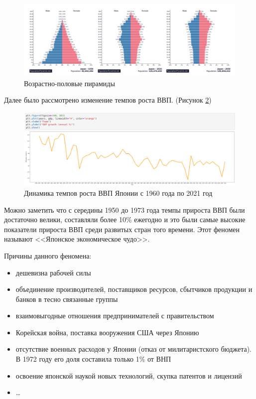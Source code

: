\documentclass[14pt,fleqn]{extarticle}
\begin{document}
	\begin{figure}[h]
		\centering \includegraphics[scale=0.43]{japan_pyramid}
		\caption{Возрастно-половые пирамиды}
		\label{fig:japan_pyramid}
	\end{figure}
	
	Далее было рассмотрено изменение темпов роста ВВП. (Рисунок \ref{fig:japan_gdp_growth_plot})
	
	\begin{figure}[h]
		\centering \includegraphics[scale=0.43]{japan_gdp_growth_plot}
		\caption{Динамика темпов роста ВВП Японии с 1960 года по 2021 год}
		\label{fig:japan_gdp_growth_plot}
	\end{figure}
	
	Можно заметить что с середины 1950 до 1973 года темпы прироста ВВП были достаточно велики, составляли более 10\% ежегодно и это были самые высокие показатели прироста ВВП среди развитых стран того времени. Этот феномен называют <<Японское экономическое чудо>>.
	
	\newpage
	
	Причины данного феномена:
	\begin{itemize}[topsep=0pt,itemsep=-1ex,partopsep=1ex,parsep=1ex]
		\item дешевизна рабочей силы
		\item объединение производителей, поставщиков ресурсов, сбытчиков продукции и банков в тесно связанные группы
		\item взаимовыгодные отношения предпринимателей с правительством
		\item Корейская война, поставка вооружения США через Японию
		\item отсутствие военных расходов у Японии (отказ от милитаристского бюджета). В 1972 году его доля составила только 1\% от ВНП
		\item освоение японской наукой новых технологий, скупка патентов и лицензий
		\item \dots\\
	\end{itemize}
\end{document}
